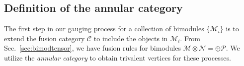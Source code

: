\documentclass[aps,prb,twocolumn,superscriptaddress,noshowkeys]{revtex4-2}  %
\newcommand{\cat}{\mathcal{C}}
\theoremstyle{plain}%
\theoremstyle{definition}
\theoremstyle{remark}
\begin{document}

\subsection{Definition of the annular category}

%
The first step in our gauging process for a collection of bimodules $\{\mathcal{M}_i\}$ is to extend the fusion category $\cat$ to include the objects in $\mathcal{M}_i$. From Sec.~\ref{sec:bimodtensor}, we have fusion rules for bimodules $\mathcal{M}\otimes\mathcal{N}=\oplus\mathcal{P}$. We utilize the \emph{annular category} to obtain trivalent vertices for these processes. 
\end{document}
